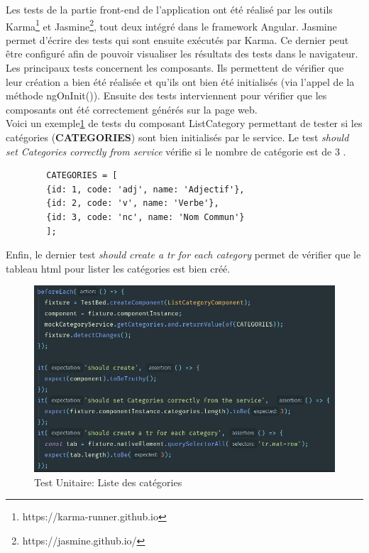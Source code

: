 \documentclass[12pt,a4paper]{article}
\begin{document}
    Les tests de la partie front-end de l'application ont été réalisé par les outils Karma\footnote{https://karma-runner.github.io} et Jasmine\footnote{https://jasmine.github.io/}, tout deux intégré dans le framework Angular.
    Jasmine permet d'écrire des tests qui sont ensuite exécutés par Karma.
    Ce dernier peut être configuré afin de pouvoir visualiser les résultats des tests dans le navigateur. \\
    Les principaux tests concernent les composants. Ils permettent de vérifier que leur création a bien été réalisée et qu'ils ont bien été initialisés (via l'appel de la méthode ngOnInit()).
    Ensuite des tests interviennent pour vérifier que les composants ont été correctement générés sur la page web. \\
    Voici un exemple\ref{ListCategory} de tests du composant ListCategory permettant de tester si les catégories (\textbf{CATEGORIES}) sont bien initialisés par le service.
    Le test \textit{should set Categories correctly from service} vérifie si le nombre de catégorie est de 3 .
    \begin{verbatim}
        CATEGORIES = [
        {id: 1, code: 'adj', name: 'Adjectif'},
        {id: 2, code: 'v', name: 'Verbe'},
        {id: 3, code: 'nc', name: 'Nom Commun'}
        ];
    \end{verbatim}
    Enfin, le dernier test \textit{should create a tr for each category} permet de vérifier que le tableau html pour lister les catégories est bien créé.

    \begin{figure}[h]
        \centering
        \includegraphics[width=170mm]{img/testlistcategory.PNG}
        \caption{Test Unitaire: Liste des catégories}
        \label{ListCategory}
    \end{figure}
\end{document}
